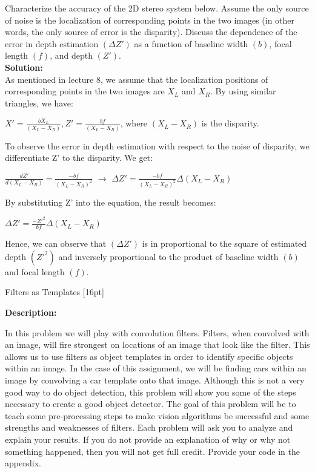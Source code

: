 \documentclass{assignment}
\begin{document}
\begin{problemlist}
Characterize the accuracy of the 2D stereo system below. Assume the only source of noise is the localization of corresponding points in the two images (in other words, the only source of error is the disparity). Discuss the dependence of the error in depth estimation $(\Delta Z')$ as a function of baseline width $(b)$, focal length $(f)$, and depth $(Z')$.\\
\textbf{Solution:}\\
As mentioned in lecture 8, we assume that the localization positions of corresponding points in the two images are $X_L$ and $X_R$. By using similar triangles, we have:\\
\begin{center}
$X' = \frac{bX_L}{(X_L-X_R)}, Z' =  \frac{bf}{(X_L-X_R)}$, where $(X_L-X_R)$ is the disparity.\\
\end{center}
To observe the error in depth estimation with respect to the noise of disparity, we differentiate Z' to the disparity. We get:\\
\begin{center}
$\frac{dZ'}{d(X_L-X_R)} = \frac{-bf}{(X_L-X_R)^2}$ $\to$ $\Delta Z' = \frac{-bf}{(X_L-X_R)^2} \Delta(X_L-X_R)$\\
\end{center}
By substituting Z' into the equation, the result becomes:\\
\begin{center}
$\Delta Z' = \frac{-Z'^2}{bf} \Delta(X_L-X_R)$\\
\end{center}
Hence, we can observe that $(\Delta Z')$ is in proportional to the square of estimated depth $(Z'^2)$ and inversely proportional to the product of baseline width $(b)$ and focal length $(f)$.



\newpage
\pbitem Filters as Templates [16pt]

\textbf{Description:}

In this problem we will play with convolution filters. Filters, when convolved with an image, will fire strongest on locations of an image that look like the filter. This allows us to use filters as object templates in order to identify specific objects within an image. In the case of this assignment, we will be finding cars within an image by convolving a car template onto that image. Although this is not a very good way to do object detection, this problem will show you some of the steps necessary to create a good object detector. The goal of this problem will be to teach some pre-processing steps to make vision algorithms be successful and some strengths and weaknesses of filters. Each problem will ask you to analyze and explain your results. If you do not provide an explanation of why or why not something happened, then you will not get full credit. Provide your code in the appendix.\\


\end{problemlist}
\end{document}
